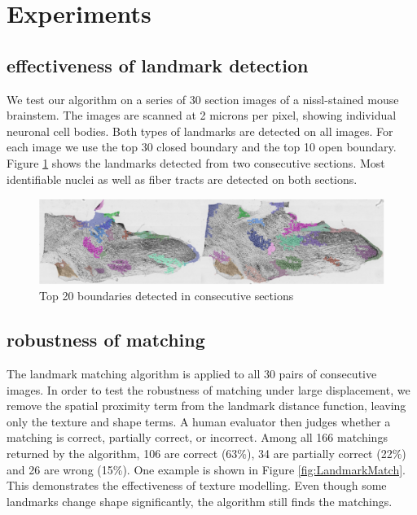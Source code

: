 \documentclass{llncs}
\begin{document}


\section{Experiments}

\subsection{effectiveness of landmark detection}

We test our algorithm on a series of 30 section images of a nissl-stained mouse brainstem. The images are scanned at 2 microns per pixel, showing individual neuronal cell bodies. Both types of landmarks are detected on all images. For each image we use the top 30 closed boundary and the top 10 open boundary. Figure \ref{fig:TopRegions} shows the landmarks detected from two consecutive sections. Most identifiable nuclei as well as fiber tracts are detected on both sections.


\begin{figure}
	\includegraphics[width=\textwidth]{../figures/TopRegions_0006_0007_Horizontal.png}
	\caption{Top 20 boundaries detected in consecutive sections}
	\label{fig:TopRegions}
\end{figure}


\subsection{robustness of matching}

The landmark matching algorithm is applied to all 30 pairs of consecutive images. In order to test the robustness of matching under large displacement, we remove the spatial proximity term from the landmark distance function, leaving only the texture and shape terms. A human evaluator then judges whether a matching is correct, partially correct, or incorrect. Among all 166 matchings returned by the algorithm, 106 are correct (63\%), 34 are partially correct (22\%) and 26 are wrong (15\%). One example is shown in Figure \ref{fig:LandmarkMatch}. This demonstrates the effectiveness of texture modelling. Even though some landmarks change shape significantly, the algorithm still finds the matchings.
\end{document}
